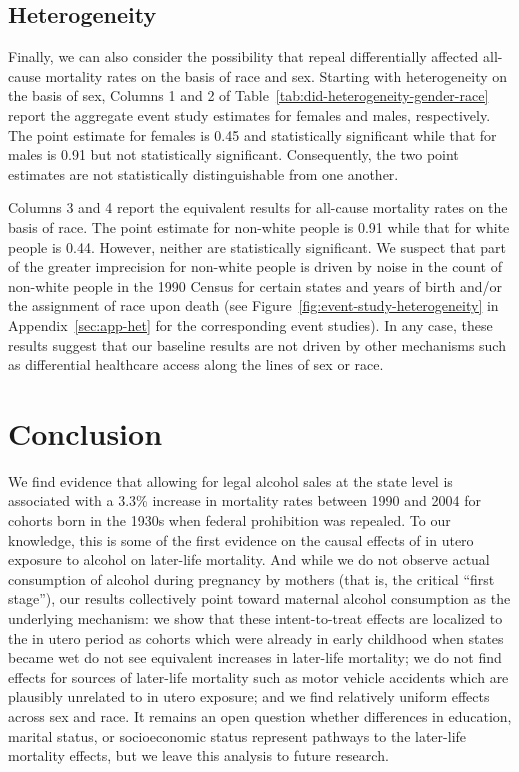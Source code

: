 \documentclass[12pt]{article}
\begin{document}
\subsection{Heterogeneity}\label{sec:heterogeneity}

Finally, we can also consider the possibility that repeal differentially affected all-cause mortality rates on the basis of race and sex. 
Starting with heterogeneity on the basis of sex, Columns 1 and 2 of Table~\ref{tab:did-heterogeneity-gender-race} report the aggregate event study estimates for females and males, respectively. 
The point estimate for females is 0.45 and statistically significant while that for males is 0.91 but not statistically significant. 
Consequently, the two point estimates are not statistically distinguishable from one another.

Columns 3 and 4 report the equivalent results for all-cause mortality rates on the basis of race. 
The point estimate for non-white people is 0.91 while that for white people is 0.44. 
However, neither are statistically significant. 
We suspect that part of the greater imprecision for non-white people is driven by noise in the count of non-white people in the 1990 Census for certain states and years of birth and/or the assignment of race upon death (see Figure~\ref{fig:event-study-heterogeneity} in Appendix~\ref{sec:app-het} for the corresponding event studies). 
In any case, these results suggest that our baseline results are not driven by other mechanisms such as differential healthcare access along the lines of sex or race. 


\section{Conclusion} \label{sec:conclusion}

We find evidence that allowing for legal alcohol sales at the state level is associated with a 3.3\% increase in mortality rates between 1990 and 2004 for cohorts born in the 1930s when federal prohibition was repealed. 
To our knowledge, this is some of the first evidence on the causal effects of in utero exposure to alcohol on later-life mortality. 
And while we do not observe actual consumption of alcohol during pregnancy by mothers (that is, the critical ``first stage''), our results collectively point toward maternal alcohol consumption as the underlying mechanism: we show that these intent-to-treat effects are localized to the in utero period as cohorts which were already in early childhood when states became wet do not see equivalent increases in later-life mortality; we do not find effects for sources of later-life mortality such as motor vehicle accidents which are plausibly unrelated to in utero exposure; and we find relatively uniform effects across sex and race. 
It remains an open question whether differences in education, marital status, or socioeconomic status represent pathways to the later-life mortality effects, but we leave this analysis to future research. 
\end{document}
